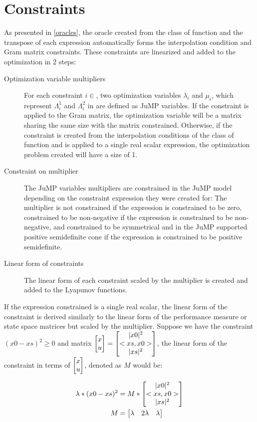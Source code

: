 \section{Constraints}
As presented in \ref{oracles}, the oracle created from the class of function and the transpose of each expression automatically forms the interpolation condition and Gram matrix constraints. These constraints are linearized and added to the optimization in 2 steps:
\begin{description}
    \item [Optimization variable multipliers] For each constraint $i \in$, two optimization variables $\lambda_i$ and $\mu_i$, which represent $\Lambda^1_i$ and $\Lambda^2_i$ in  are defined as JuMP variables. If the constraint is applied to the Gram matrix, the optimization variable will be a matrix sharing the same size with the matrix constrained. Otherwise, if the constraint is created from the interpolation conditions of the class of function and is applied to a single real scalar expression, the optimization problem created will have a size of 1.
    \item [Constraint on multiplier] The JuMP variables multipliers are constrained in the JuMP model depending on the constraint expression they were created for: The multiplier is not constrained if the expression is constrained to be zero, constrained to be non-negative if the expression is constrained to be non-negative, and constrained to be symmetrical and in the JuMP supported positive semidefinite cone if the expression is constrained to be positive semidefinite.
    \item [Linear form of constraints] The linear form of each constraint scaled by the multiplier is created and added to the Lyapunov functions.
\end{description}

If the expression constrained is a single real scalar, the linear form of the constraint is derived similarly to the linear form of the performance measure or state space matrices but scaled by the multiplier. Suppose we have the constraint $(x0 - xs)^2 \geq 0$ and matrix $\begin{bmatrix}x\\ u\end{bmatrix} = \begin{bmatrix}|x0|^2\\ <xs, x0>\\ |xs|^2\end{bmatrix}$, the linear form of the constraint in terms of $\begin{bmatrix}x\\ u\end{bmatrix}$, denoted as $M$ would be:

\begin{subequations} \label{eqn:constraint_single}
	\begin{align}
    \lambda * (x0 - xs)^2 &= M * \begin{bmatrix}|x0|^2\\ <xs, x0>\\ |xs|^2\end{bmatrix} \label{eq_cons_single1}       \\
	M &= \begin{bmatrix}\lambda& 2\lambda & \lambda\end{bmatrix} \label{eq_cons_single2}
	\end{align}
\end{subequations}

